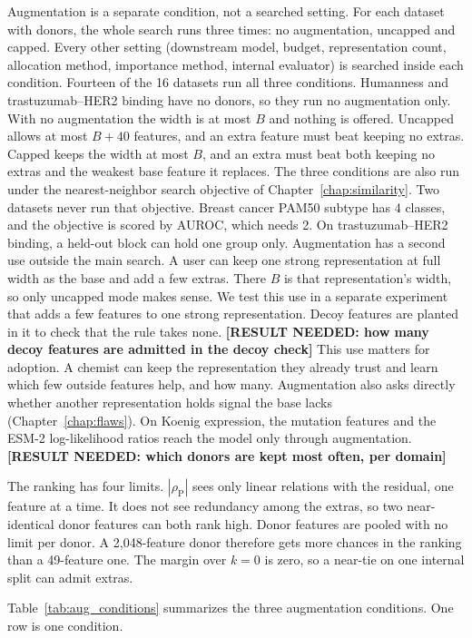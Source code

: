 Augmentation is a separate condition, not a searched setting. For each dataset with donors, the whole search runs three times: no augmentation, uncapped and capped. Every other setting (downstream model, budget, representation count, allocation method, importance method, internal evaluator) is searched inside each condition. Fourteen of the 16 datasets run all three conditions. Humanness and trastuzumab--HER2 binding have no donors, so they run no augmentation only. With no augmentation the width is at most $B$ and nothing is offered. Uncapped allows at most $B + 40$ features, and an extra feature must beat keeping no extras. Capped keeps the width at most $B$, and an extra must beat both keeping no extras and the weakest base feature it replaces. The three conditions are also run under the nearest-neighbor search objective of Chapter~\ref{chap:similarity}. Two datasets never run that objective. Breast cancer PAM50 subtype has 4 classes, and the objective is scored by AUROC, which needs 2. On trastuzumab--HER2 binding, a held-out block can hold one group only. Augmentation has a second use outside the main search. A user can keep one strong representation at full width as the base and add a few extras. There $B$ is that representation's width, so only uncapped mode makes sense. We test this use in a separate experiment that adds a few features to one strong representation. Decoy features are planted in it to check that the rule takes none. \textbf{[RESULT NEEDED: how many decoy features are admitted in the decoy check]} This use matters for adoption. A chemist can keep the representation they already trust and learn which few outside features help, and how many. Augmentation also asks directly whether another representation holds signal the base lacks (Chapter~\ref{chap:flaws}). On Koenig expression, the mutation features and the ESM-2 log-likelihood ratios reach the model only through augmentation. \textbf{[RESULT NEEDED: which donors are kept most often, per domain]}

The ranking has four limits. $|\rho_{\mathrm{P}}|$ sees only linear relations with the residual, one feature at a time. It does not see redundancy among the extras, so two near-identical donor features can both rank high. Donor features are pooled with no limit per donor. A 2,048-feature donor therefore gets more chances in the ranking than a 49-feature one. The margin over $k=0$ is zero, so a near-tie on one internal split can admit extras.

Table~\ref{tab:aug_conditions} summarizes the three augmentation conditions. One row is one condition.


